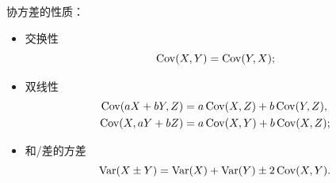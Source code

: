 \begin{corollary}
	协方差的性质：
	\begin{itemize}
		\item 交换性
		\begin{equation}
			\operatorname{Cov}(X,Y) = \operatorname{Cov}(Y,X);
		\end{equation}
		\item 双线性
		\begin{subequations}
			\begin{align}
				\operatorname{Cov}(aX + bY,Z) &= a\operatorname{Cov}(X,Z) + b\operatorname{Cov}(Y,Z),\\
				\operatorname{Cov}(X,aY + bZ) &= a\operatorname{Cov}(X,Y) + b\operatorname{Cov}(X,Z);
			\end{align}
		\end{subequations}
		\item 和/差的方差
		\begin{equation}
			\operatorname{Var}(X \pm Y) = \operatorname{Var}(X) + \operatorname{Var}(Y) \pm 2\operatorname{Cov}(X,Y).
		\end{equation}
	\end{itemize}
\end{corollary}

